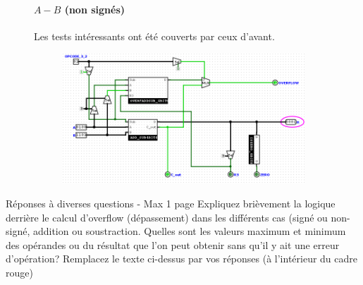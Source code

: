 \documentclass[a4paper]{article}
\begin{document}
\begin{tcolorbox}[colframe=Monokaimagenta,colback=white]
\begin{figure}[H]
\paragraph{$A-B$ (non signés)}
Les tests intéressants ont été couverts par ceux d'avant. \\

\begin{figure}[H]
    \centering
    \includegraphics[width=\textwidth]{src/ADDSUB_TEST_AmoNsB.png}
    \label{fig:OVERFADDSUB_4BITS}
\end{figure}

\end{figure}


\end{tcolorbox}

\begin{tcolorbox}[colframe=Monokaimagenta,colback=white]
Réponses à diverses questions - Max 1 page
Expliquez brièvement la logique derrière le calcul d’overflow (dépassement) dans les différents cas (signé ou non-signé, addition ou soustraction.
Quelles sont les valeurs maximum et minimum des opérandes ou du résultat que l’on peut obtenir sans qu’il y ait une erreur d’opération?
Remplacez le texte ci-dessus par vos réponses (à l’intérieur du cadre rouge)
\end{tcolorbox}
\end{document}
